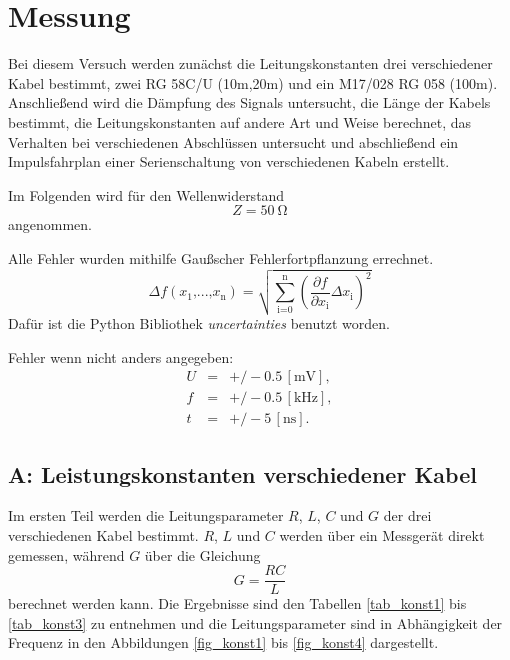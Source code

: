 \FloatBarrier
\section{Messung} %
\label{sec:section_name}

Bei diesem Versuch werden zunächst die Leitungskonstanten drei verschiedener Kabel bestimmt, zwei RG 58C/U (10m,20m) und ein M17/028 RG 058 (100m).
Anschließend wird die Dämpfung des Signals untersucht, die Länge der Kabels bestimmt, die Leitungskonstanten auf andere Art und Weise berechnet, das Verhalten bei verschiedenen Abschlüssen untersucht und abschließend ein Impulsfahrplan einer Serienschaltung von verschiedenen Kabeln erstellt.

Im Folgenden wird für den Wellenwiderstand
\begin{equation*}
	Z = \SI{50}{\ohm}
\end{equation*}
angenommen.

Alle Fehler wurden mithilfe Gaußscher Fehlerfortpflanzung errechnet.
\begin{equation*}
	\Delta f(x_\text{1}\text{,...,}x_\text{n}) = \sqrt{\sum_\text{i=0}^\text{n} \left(\frac{\partial f}{\partial x_\text{i}} \Delta x_\text{i}\right)^2}
\end{equation*}
Dafür ist die Python Bibliothek \textit{uncertainties} benutzt worden.

Fehler wenn nicht anders angegeben:
\begin{eqnarray*}
	U &=& +/-0.5\,[\text{mV}],\\
	f &=& +/-0.5\,[\text{kHz}],\\
	t &=& +/-5\,[\text{ns}].
\end{eqnarray*}

\subsection{A: Leistungskonstanten verschiedener Kabel} %
\label{sub:a_}


Im ersten Teil werden die Leitungsparameter $R$, $L$, $C$ und $G$ der drei verschiedenen Kabel bestimmt.
$R$, $L$ und $C$ werden über ein Messgerät direkt gemessen, während $G$ über die Gleichung
\begin{equation*}
	G = \frac{R C}{L}
\end{equation*}
berechnet werden kann.
Die Ergebnisse sind den Tabellen \ref{tab_konst1} bis \ref{tab_konst3} zu entnehmen und die Leitungsparameter sind in Abhängigkeit der Frequenz in den Abbildungen \ref{fig_konst1} bis \ref{fig_konst4} dargestellt.


